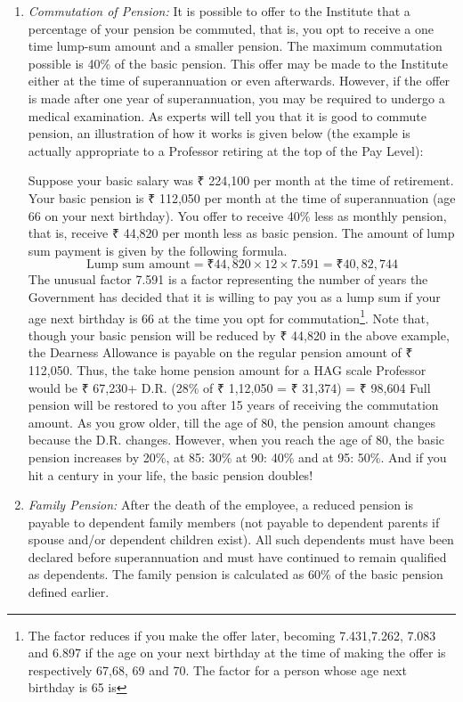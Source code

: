 \documentclass[
  10pt,
  a5paper,
  10pt,
  openany]{amsbook}
\begin{document}
\begin{enumerate}
\def\labelenumi{\alph{enumi}.}
\setcounter{enumi}{1}
\item
  \emph{Commutation of Pension:} It is possible to offer to the
  Institute that a percentage of your pension be commuted, that is, you
  opt to receive a one time lump-sum amount and a smaller pension. The
  maximum commutation possible is 40\% of the basic pension. This offer
  may be made to the Institute either at the time of superannuation or
  even afterwards. However, if the offer is made after one year of
  superannuation, you may be required to undergo a medical examination.
  As experts will tell you that it is good to commute pension, an
  illustration of how it works is given below (the example is actually
  appropriate to a Professor retiring at the top of the Pay Level):

  Suppose your basic salary was ₹ 224,100 per month at the time of
  retirement. Your basic pension is ₹ 112,050 per month at the time of
  superannuation (age 66 on your next birthday). You offer to receive
  40\% less as monthly pension, that is, receive ₹ 44,820 per month less
  as basic pension. The amount of lump sum payment is given by the
  following formula. \[ \mbox{Lump sum
  amount} = \text{₹} 44,820 \times12 \times 7.591 = \text{₹}
  40,82,744 \] The unusual factor 7.591 is a factor representing the
  number of years the Government has decided that it is willing to pay
  you as a lump sum if your age next birthday is 66 at the time you opt
  for commutation\footnote{The factor reduces if you make the offer
    later, becoming 7.431,7.262, 7.083 and 6.897 if the age on your next
    birthday at the time of making the offer is respectively 67,68, 69
    and 70. The factor for a person whose age next birthday is 65 is}.
  Note that, though your basic pension will be reduced by ₹ 44,820 in
  the above example, the Dearness Allowance is payable on the regular
  pension amount of ₹ 112,050. Thus, the take home pension amount for a
  HAG scale Professor would be ₹ 67,230+ D.R. (28\% of ₹ 1,12,050 = ₹
  31,374) = ₹ 98,604 Full pension will be restored to you after 15 years
  of receiving the commutation amount. As you grow older, till the age
  of 80, the pension amount changes because the D.R. changes. However,
  when you reach the age of 80, the basic pension increases by 20\%, at
  85: 30\% at 90: 40\% and at 95: 50\%. And if you hit a century in your
  life, the basic pension doubles!
\item
  \emph{Family Pension:} After the death of the employee, a reduced
  pension is payable to dependent family members (not payable to
  dependent parents if spouse and/or dependent children exist). All such
  dependents must have been declared before superannuation and must have
  continued to remain qualified as dependents. The family pension is
  calculated as 60\% of the basic pension defined earlier.


\end{enumerate}
\end{document}
